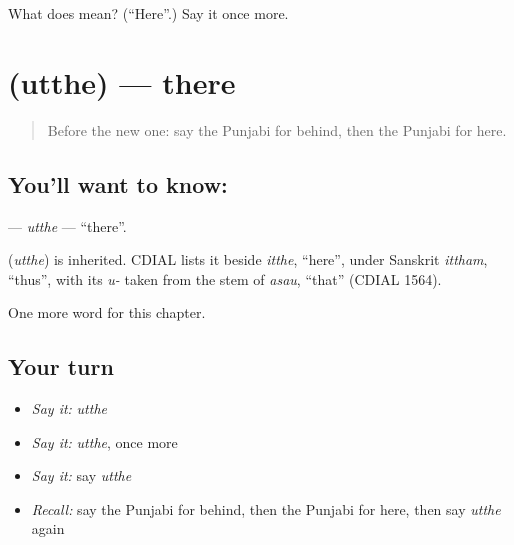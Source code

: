 \begin{tcolorbox}[breakable,colback=teal!4,colframe=teal!35!black,title={Before you move on}]
What does  mean? (\textquotedblleft{}Here\textquotedblright{}.) Say it once more.
\end{tcolorbox}
\section[\texorpdfstring{\pa{ਉੱਥੇ} (utthe)}{ਉੱਥੇ (utthe)}]{ (utthe) — there}

\label{lesson:PA-C89-utthe}



\begin{quote}
Before the new one: say the Punjabi for behind, then the Punjabi for here.
\end{quote}

\subsection*{You'll want to know: }
\textbf{} — \emph{utthe} — \textquotedblleft{}there\textquotedblright{}.

\begin{cousinweb}
\textbf{} (\emph{utthe}) is inherited. CDIAL lists it beside \emph{itthe}, \textquotedblleft{}here\textquotedblright{}, under Sanskrit \emph{ittham}, \textquotedblleft{}thus\textquotedblright{}, with its \emph{u-} taken from the stem of \emph{asau}, \textquotedblleft{}that\textquotedblright{} (CDIAL 1564).
\end{cousinweb}

\begin{grammarlens}[title={What you've built}]
One more word for this chapter.
\end{grammarlens}

\subsection*{Your turn}
\begin{itemize}
\raggedright
  \item \emph{Say it:} \emph{utthe}
  \item \emph{Say it:} \emph{utthe}, once more
  \item \emph{Say it:} say \emph{utthe}
  \item \emph{Recall:} say the Punjabi for behind, then the Punjabi for here, then say \emph{utthe} again
\end{itemize}

